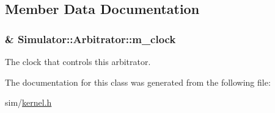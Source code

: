 \subsection{Member Data Documentation}
\hypertarget{class_simulator_1_1_arbitrator_ae81bdde0ba892172b8594a25dd2ef9cc}{
\subsubsection[{m\+\_\+clock}]{\& Simulator\+::\+Arbitrator\+::m\+\_\+clock\hspace{0.3cm}{\ttfamily [protected]}}}\label{class_simulator_1_1_arbitrator_ae81bdde0ba892172b8594a25dd2ef9cc}


The clock that controls this arbitrator. 



The documentation for this class was generated from the following file\+:\begin{DoxyCompactItemize}
\item 
sim/\hyperlink{kernel_8h}{kernel.\+h}\end{DoxyCompactItemize}
